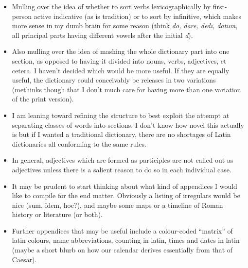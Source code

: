 \begin{itemize}
{    masculine, feminine, neuter}, since I really don't want to
    type those out every time, nor do I want them to appear so
    conspicuously and ubiquitously.  Personal preference.
  \item Mulling over the idea of whether to sort verbs
    lexicographically by first-person active indicative (as
    is tradition) or to sort by infinitive, which makes
    more sense in my dumb brain for some reason (think
    \textit{d\=o, d\=are, ded\=i, datum}, all principal parts
    having different vowels after the initial \textit{d}).
  \item Also mulling over the idea of mashing the whole
    dictionary part into one section, as opposed to having
    it divided into nouns, verbs, adjectives, et cetera.
    I haven't decided which would be more useful.  If they
    are equally useful, the dictionary could conceivably
    be releases in two variations (methinks though that I
    don't much care for having more than one variation of
    the print version).
  \item I am leaning toward refining the structure to best
    exploit the attempt at separating classes of words into
    sections.  I don't know how novel this actually is but
    if I wanted a traditional dictionary, there are no
    shortages of Latin dictionaries all conforming to the
    same rules.
  \item In general, adjectives which are formed as
    participles are not called out as adjectives unless
    there is a salient reason to do so in each individual
    case.
  \item It may be prudent to start thinking about what kind
    of appendices I would like to compile for the end
    matter.  Obviously a listing of irregulars would be
    nice (sum, \=idem, hoc?), and maybe some maps or a
    timeline of Roman history or literature (or both).
  \item Further appendices that may be useful include a
    colour-coded ``matrix'' of latin colours, name
    abbreviations, counting in latin, times and dates
    in latin (maybe a short blurb on how our calendar
    derives essentially from that of Caesar).
\end{itemize}
